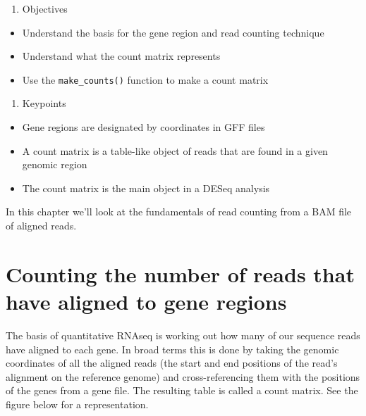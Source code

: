 \documentclass[]{book}
\providecommand{\tightlist}{%
  \setlength{\itemsep}{0pt}\setlength{\parskip}{0pt}}
\begin{document}
\begin{enumerate}
\def\labelenumi{\arabic{enumi}.}
\setcounter{enumi}{1}
\tightlist
\item
  Objectives
\end{enumerate}

\begin{itemize}
\tightlist
\item
  Understand the basis for the gene region and read counting technique
\item
  Understand what the count matrix represents
\item
  Use the \texttt{make\_counts()} function to make a count matrix
\end{itemize}

\begin{enumerate}
\def\labelenumi{\arabic{enumi}.}
\setcounter{enumi}{2}
\tightlist
\item
  Keypoints
\end{enumerate}

\begin{itemize}
\tightlist
\item
  Gene regions are designated by coordinates in GFF files
\item
  A count matrix is a table-like object of reads that are found in a given genomic region
\item
  The count matrix is the main object in a DESeq analysis
\end{itemize}

In this chapter we'll look at the fundamentals of read counting from a BAM file of aligned reads.

\hypertarget{counting-the-number-of-reads-that-have-aligned-to-gene-regions}{%
\section{Counting the number of reads that have aligned to gene regions}\label{counting-the-number-of-reads-that-have-aligned-to-gene-regions}}

The basis of quantitative RNAseq is working out how many of our sequence reads have aligned to each gene. In broad terms this is done by taking the genomic coordinates of all the aligned reads (the start and end positions of the read's alignment on the reference genome) and cross-referencing them with the positions of the genes from a gene file. The resulting table is called a count matrix. See the figure below for a representation.
\end{document}
